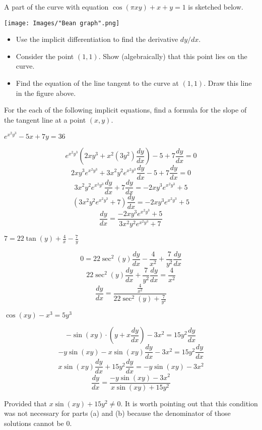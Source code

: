 \documentclass[handout,nooutcomes]{ximera}
\renewenvironment{freeResponse}{
\ifhandout\setbox0\vbox\bgroup\else
\begin{trivlist}\item[\hskip \labelsep\bfseries Solution:\hspace{2ex}]
\fi}
{\ifhandout\egroup\else
\end{trivlist}
\fi}
\newcommand{\dd}[2][]{\frac{d #1}{d #2}}
\begin{document}
\begin{problem}
  A part of the curve with equation $\cos(\pi x y) + x + y = 1$ is sketched below.
  \begin{image}
    \texttt{[image: Images/"Bean graph".png]}
  \end{image}
  \begin{itemize}
    \item[(a)]
      Use the implicit differentiation to find the derivative $dy/dx$.

    \item[(b)]
      Consider the point $(1, 1)$.
      Show (algebraically) that this point lies on the curve.

    \item[(c)]
      Find the equation of the line tangent to the curve at $(1,1)$.
      Draw this line in the figure above.
  \end{itemize}
\end{problem}

\begin{problem}
  For the each of the following implicit equations, find a formula for the slope of the tangent line at a point $(x, y)$.
  \begin{enumerate}
    \item
      $e^{x^2 y^3} - 5x + 7y = 36$
			\begin{freeResponse}
			$$ e^{x^2 y^3} \left( 2xy^3 + x^2 (3y^2)\dd[y]{x} \right) - 5 + 7\dd[y]{x} = 0 $$
			$$ 2xy^3 e^{x^2y^3} + 3x^2y^2e^{x^2y^3}\dd[y]{x} - 5 + 7\dd[y]{x} = 0 $$
			$$ 3x^2y^2e^{x^2y^3}\dd[y]{x} + 7\dd[y]{x} = -2xy^3 e^{x^2y^3} + 5 $$
			$$ \left( 3x^2y^2e^{x^2y^3} + 7 \right) \dd[y]{x} = -2xy^3 e^{x^2y^3} + 5 $$
			$$  \dd[y]{x} = \frac{-2xy^3 e^{x^2y^3} + 5}{3x^2 y^2 e^{x^2y^3} + 7} $$
			\end{freeResponse}
			
     \item
       $7 = 22 \tan(y) + \frac{4}{x} - \frac{7}{y}$
			\begin{freeResponse}
			$$ 0 = 22 \sec^2 (y) \dd[y]{x} - \frac{4}{x^2} + \frac{7}{y^2} \dd[y]{x} $$
			$$ 22 \sec^2(y) \dd[y]{x} + \frac{7}{y^2} \dd[y]{x} = \frac{4}{x^2} $$
			$$ \dd[y]{x} = \frac{\frac{4}{x^2}}{22 \sec^2(y) + \frac{7}{y^2}} $$
			\end{freeResponse}

     \item
       $\cos(xy) - x^3 = 5y^3$
			\begin{freeResponse}
			$$ -\sin(xy) \cdot \left(y + x \dd[y]{x} \right) - 3x^2 = 15y^2 \dd[y]{x} $$
			$$ -y \sin(xy) - x \sin(xy) \dd[y]{x} - 3x^2 = 15y^2 \dd[y]{x} $$
			$$ x \sin(xy) \dd[y]{x} + 15y^2 \dd[y]{x} = -y \sin(xy) - 3x^2 $$
			$$ \dd[y]{x} = \frac{-y \sin(xy) - 3x^2}{x \sin(xy) + 15y^2} $$
			
			Provided that $x \sin(xy) + 15y^2 \neq 0$.  It is worth pointing out that this condition was not necessary for parts (a) and (b) because the denominator of those solutions cannot be $0$.  
			\end{freeResponse}
	\end{enumerate}
\end{problem}
\end{document}
